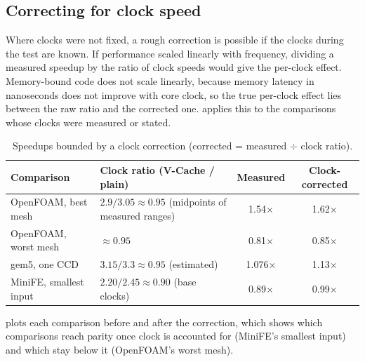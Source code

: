 \subsection{Correcting for clock speed}
\label{sec:clock-correction}
Where clocks were not fixed, a rough correction is possible if the clocks during the test are known. If performance scaled linearly with frequency, dividing a measured speedup by the ratio of clock speeds would give the per-clock effect. Memory-bound code does not scale linearly, because memory latency in nanoseconds does not improve with core clock, so the true per-clock effect lies between the raw ratio and the corrected one.  applies this to the comparisons whose clocks were measured or stated.

\begin{table}[htbp]
  \centering
  \caption[Speedups bounded by a clock correction]{Speedups bounded by a clock correction (corrected = measured $\div$ clock ratio).}
  \label{tab:clock-correction}
  \small
  \begin{tabularx}{\textwidth}{@{}>{\raggedright\arraybackslash}X>{\raggedright\arraybackslash}p{3.2cm}cc@{}}
    \toprule
    \textbf{Comparison} & \textbf{Clock ratio (V-Cache / plain)} & \textbf{Measured} & \textbf{Clock-corrected} \\
    \midrule
    OpenFOAM, best mesh \cite{lawendaEvaluatingImpactL32025} & $2.9/3.05 \approx 0.95$ (midpoints of measured ranges) & 1.54$\times$ & 1.62$\times$ \\
    OpenFOAM, worst mesh \cite{lawendaEvaluatingImpactL32025} & $\approx 0.95$ & 0.81$\times$ & 0.85$\times$ \\
    gem5, one CCD \cite{cozmaDeepDivingZen2022} & $3.15/3.3 \approx 0.95$ (estimated) & 1.076$\times$ & 1.13$\times$ \\
    MiniFE, smallest input \cite{domkeLocusPerformanceQuantifying2023} & $2.20/2.45 \approx 0.90$ (base clocks) & 0.89$\times$ & 0.99$\times$ \\
    \bottomrule
  \end{tabularx}
\end{table}
 plots each comparison before and after the correction, which shows which comparisons reach parity once clock is accounted for (MiniFE's smallest input) and which stay below it (OpenFOAM's worst mesh).

